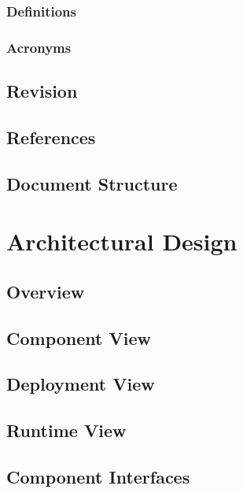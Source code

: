 \documentclass[12pt]{article}
\begin{document}
\subsubsection{Definitions}


\subsubsection{Acronyms}


\subsection{Revision}

\subsection{References}


\subsection{Document Structure}

\clearpage

\section{Architectural Design}

\subsection{Overview}

\subsection{Component View}

\subsection{Deployment View}

\subsection{Runtime View}

\subsection{Component Interfaces}

\end{document}
